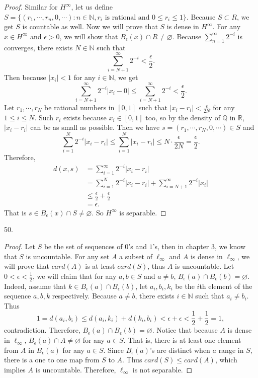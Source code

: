 \documentclass[12pt, a4paper]{article}
\theoremstyle{plain}
\newcommand{\N}{\mathbb{N}}
\newcommand{\Q}{\mathbb{Q}}
\newcommand{\R}{\mathbb{R}}
\begin{document}
\begin{proof}
Similar for $H^\infty$, let us define $S=\{(r_1,\cdots,r_n,0,\cdots):n\in\N, r_i \text{ is rational and } 0\leq r_i\leq 1\}$. Because $S\subset R$, we get $S$ is countable as well. Now we will prove that $S$ is dense in $H^\infty$. For any $x\in H^\infty$ and $\epsilon>0$, we will show that $B_\epsilon(x)\cap R\neq \varnothing$. Because $\sum_{n=1}^{\infty}{2^{-i}}$ is converges, there exists $N\in\N$ such that 
\[
\sum_{i=N+1}^{\infty}{2^{-i}}<\frac{\epsilon}{2}.
\]
Then because $|x_i|<1$ for any $i\in\N$, we get
\[
\sum_{i=N+1}^{\infty}{2^{-i}|x_i-0|}\leq \sum_{i=N+1}^{\infty}{2^{-i}}<\frac{\epsilon}{2}.
\]
Let $r_1,\cdots ,r_N$ be rational numbers in $[0,1]$ such that $|x_i-r_i|<\frac{\epsilon}{2N}$ for any $1\leq i\leq N$. Such $r_i$ exists because $x_i\in [0,1]$ too, so by the density of $\Q$ in $\R$, $|x_i-r_i|$ can be as small as possible. Then we have $s=(r_1,\cdots,r_N,0,\cdots)\in S$ and
\[
\sum_{i=1}^{N}{2^{-i}|x_i-r_i|}\leq \sum_{i=1}^{N}{|x_i-r_i|}\leq N\cdot \frac{\epsilon}{2N}=\frac{\epsilon}{2}.
\]
Therefore, 
\begin{align*}
d(x,s)&=\sum_{i=1}^{\infty}{2^{-i}|x_i-r_i|}\\
&=\sum_{i=1}^{N}{2^{-i}|x_i-r_i|}+\sum_{i=N+1}^{\infty}{2^{-i}|x_i|}\\
&\leq \frac{\epsilon}{2}+\frac{\epsilon}{2}\\
&=\epsilon.
\end{align*}
That is $s\in B_\epsilon(x)\cap S\neq \varnothing$. So $H^\infty$ is separable.
\end{proof}

50.
\begin{proof}
Let $S$ be the set of sequences of $0$'s and $1$'s, then in chapter 3, we know that $S$ is uncountable. For any set $A$ a subset of $\ell_\infty$ and $A$ is dense in $\ell_\infty$, we will prove that $card(A)$ is at least $card(S)$, thus $A$ is uncountable. Let $0<\epsilon<\frac{1}{2}$, we will claim that for any $a,b\in S$ and $a\neq b$, $B_\epsilon(a)\cap B_\epsilon(b)=\varnothing$. Indeed, assume that $k\in B_\epsilon(a)\cap B_\epsilon(b)$, let $a_i,b_i,k_i$ be the $i$th element of the sequence $a,b,k$ respectively. Because $a\neq b$, there exists $i\in \N$ such that $a_i\neq b_i$. Thus
\[
1= d(a_i,b_i)\leq d(a_i,k_i)+d(k_i,b_i)<\epsilon +\epsilon<\frac{1}{2}+\frac{1}{2}=1,
\]
contradiction. Therefore, $B_\epsilon(a)\cap B_\epsilon(b)=\varnothing$. Notice that because $A$ is dense in $\ell_\infty$, $B_\epsilon(a)\cap A\neq \varnothing$ for any $a\in S$. That is, there is at least one element from $A$ in $B_\epsilon(a)$ for any $a\in S$. Since $B_\epsilon(a)$'s are distinct when $a$ range in $S$, there is a one to one map from $S$ to $A$. Thus $card(S)\leq card(A)$, which implies $A$ is uncountable. Therefore, $\ell_\infty$ is not separable. 
\end{proof}
\end{document}
